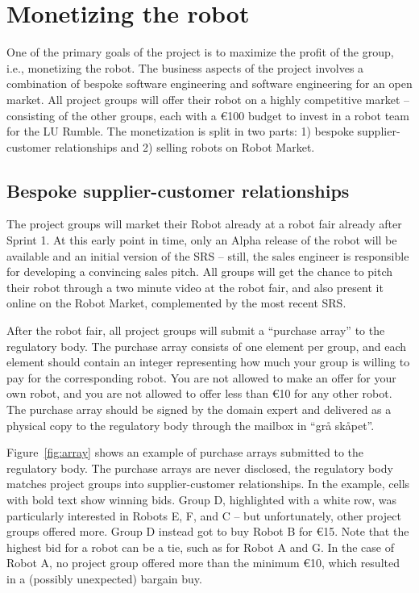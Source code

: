 \documentclass{scrreprt}
\begin{document}
\section{Monetizing the robot}
One of the primary goals of the project is to maximize the profit of the group, i.e., monetizing the robot. The business aspects of the project involves a combination of bespoke software engineering and software engineering for an open market. All project groups will offer their robot on a highly competitive market -- consisting of the other groups, each with a \euro 100 budget to invest in a robot team for the LU Rumble. The monetization is split in two parts: 1) bespoke supplier-customer relationships and 2) selling robots on Robot Market.

\subsection{Bespoke supplier-customer relationships}
The project groups will market their Robot already at a robot fair already after Sprint 1. At this early point in time, only an Alpha release of the robot will be available and an initial version of the SRS -- still, the sales engineer is responsible for developing a convincing sales pitch. All groups will get the chance to pitch their robot through a two minute video at the robot fair, and also present it online on the Robot Market, complemented by the most recent SRS.

After the robot fair, all project groups will submit a ``purchase array'' to the regulatory body. The purchase array consists of one element per group, and each element should contain an integer representing how much your group is willing to pay for the corresponding robot. You are not allowed to make an offer for your own robot, and you are not allowed to offer less than \euro 10 for any other robot. The purchase array should be signed by the domain expert and delivered as a physical copy to the regulatory body through the mailbox in ``grå skåpet''.

Figure~\ref{fig:array} shows an example of purchase arrays submitted to the regulatory body. The purchase arrays are never disclosed, the regulatory body matches project groups into supplier-customer relationships. In the example, cells with bold text show winning bids. Group D, highlighted with a white row, was particularly interested in Robots E, F, and C -- but unfortunately, other project groups offered more. Group D instead got to buy Robot B for \euro 15. Note that the highest bid for a robot can be a tie, such as for Robot A and G. In the case of Robot A, no project group offered more than the minimum \euro 10, which resulted in a (possibly unexpected) bargain buy. 
\end{document}
